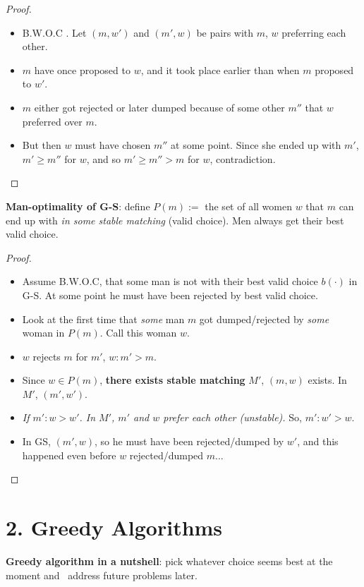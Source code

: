 \documentclass{memoir}
\begin{document}
\begin{multicols*}{3}
\begin{proof}{}{}
		\begin{itemize}
				\item B.W.O.C . Let $(m,w')$ and $(m',w)$ be pairs with $m$, $w$ preferring each other. 
				\item $m$ have once proposed to $w$, and it took place earlier than when $m$ proposed to $w'$.
				\item $m$ either got rejected or later dumped because of some other $m''$ that $w$ preferred over $m$.
				\item But then $w$ must have chosen $m''$ at some point. Since she ended up with $m'$, $m' \geqslant m''$ for $w$, and so $m' \geqslant m'' > m$ for $w$, contradiction.
		\end{itemize}
\end{proof}

\textbf{Man-optimality of G-S}: define $P(m):=$ the set of all women $w$ that $m$ can end up with \emph{in some stable matching} (valid choice). Men always get their best valid choice.

\begin{proof}{}{}
		\begin{itemize}
				\item Assume B.W.O.C, that some man is not with their best valid choice $b(\boldsymbol\cdot )$ in G-S. At some point he must have been rejected by best valid choice.
				\item Look at the first time that \emph{some} man $m$ got dumped/rejected by \emph{some} woman in $P(m)$. Call this woman $w$. 
				\item $w$ rejects $m$ for $m'$, $w: m'>m$.
				\item Since $w\in P(m)$, \textbf{there exists stable matching} $M'$, $(m,w)$ exists. In $M'$, $(m',w')$.
				\item \textit{If $m': w > w'$. In $M'$, $m'$ and $w$ prefer each other (unstable).} So, $m': w'>w$.
				\item In GS, $(m',w)$, so he must have been rejected/dumped by $w'$, and this happened even before $w$ rejected/dumped $m$...
				\qedhere
		\end{itemize}
\end{proof}


\section*{2. Greedy Algorithms}

\textbf{Greedy algorithm in a nutshell}: pick whatever choice seems best at the moment and \ address future problems later. 


\end{multicols*}
\end{document}

